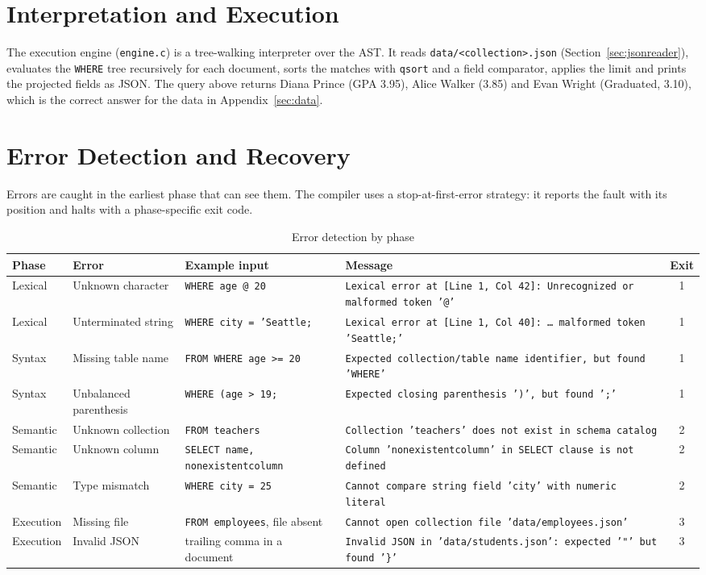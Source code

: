 \documentclass[12pt,a4paper]{report}
\newcommand{\codeus}{\textunderscore\allowbreak}
\DeclareRobustCommand{\code}[1]{\texttt{\let\_\codeus #1}}
\begin{document}
\section{Interpretation and Execution}
The execution engine (\code{engine.c}) is a tree-walking interpreter over the AST. It reads \code{data/<collection>.json} (Section~\ref{sec:jsonreader}), evaluates the \code{WHERE} tree recursively for each document, sorts the matches with \code{qsort} and a field comparator, applies the limit and prints the projected fields as JSON. The query above returns Diana Prince (GPA 3.95), Alice Walker (3.85) and Evan Wright (Graduated, 3.10), which is the correct answer for the data in Appendix~\ref{sec:data}.

\section{Error Detection and Recovery}
Errors are caught in the earliest phase that can see them. The compiler uses a stop-at-first-error strategy: it reports the fault with its position and halts with a phase-specific exit code.
\begin{table}[H]
\centering\footnotesize
\setlength{\tabcolsep}{4pt}
\begin{tabularx}{\linewidth}{|P{1.5cm}|P{2.1cm}|P{3.4cm}|L|c|}
\hline
\textbf{Phase} & \textbf{Error} & \textbf{Example input} & \textbf{Message} & \textbf{Exit} \\ \hline
Lexical & Unknown character & \code{WHERE age @ 20} & \code{Lexical error at [Line 1, Col 42]: Unrecognized or malformed token '@'} & 1 \\ \hline
Lexical & Unterminated string & \code{WHERE city = 'Seattle;} & \code{Lexical error at [Line 1, Col 40]: \ldots\ malformed token 'Seattle;'} & 1 \\ \hline
Syntax & Missing table name & \code{FROM WHERE age >= 20} & \code{Expected collection/table name identifier, but found 'WHERE'} & 1 \\ \hline
Syntax & Unbalanced parenthesis & \code{WHERE (age > 19;} & \code{Expected closing parenthesis ')', but found ';'} & 1 \\ \hline
Semantic & Unknown collection & \code{FROM teachers} & \code{Collection 'teachers' does not exist in schema catalog} & 2 \\ \hline
Semantic & Unknown column & \code{SELECT name, nonexistent\_column} & \code{Column 'nonexistent\_column' in SELECT clause is not defined} & 2 \\ \hline
Semantic & Type mismatch & \code{WHERE city = 25} & \code{Cannot compare string field 'city' with numeric literal} & 2 \\ \hline
Execution & Missing file & \code{FROM employees}, file absent & \code{Cannot open collection file 'data/employees.json'} & 3 \\ \hline
Execution & Invalid JSON & trailing comma in a document & \code{Invalid JSON in 'data/students.json': expected '"' but found '\}'} & 3 \\ \hline
\end{tabularx}
\caption{Error detection by phase}
\end{table}
\end{document}

